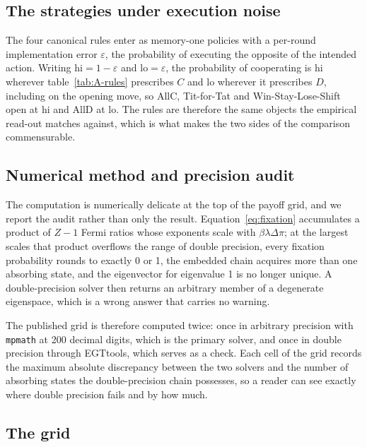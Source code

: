 \documentclass[openacc]{rsproca_new}
\newcommand{\lam}{\lambda}
\begin{document}
\subsection{The strategies under execution noise}\label{appendix:egt_strategies}

The four canonical rules enter as memory-one policies with a per-round
implementation error $\varepsilon$, the probability of executing the opposite
of the intended action. Writing $\mathrm{hi} = 1 - \varepsilon$ and
$\mathrm{lo} = \varepsilon$, the probability of cooperating is $\mathrm{hi}$
wherever table~\ref{tab:A-rules} prescribes $C$ and $\mathrm{lo}$ wherever it
prescribes $D$, including on the opening move, so AllC, Tit-for-Tat and
Win-Stay-Lose-Shift open at $\mathrm{hi}$ and AllD at $\mathrm{lo}$. The rules
are therefore the same objects the empirical read-out matches against, which is
what makes the two sides of the comparison commensurable.

\subsection{Numerical method and precision audit}\label{appendix:egt_numerics}

The computation is numerically delicate at the top of the payoff grid, and we
report the audit rather than only the result. Equation~\eqref{eq:fixation}
accumulates a product of $Z-1$ Fermi ratios whose exponents scale with
$\beta \lam \Delta\pi$; at the largest scales that product overflows the range
of double precision, every fixation probability rounds to exactly 0 or 1, the
embedded chain acquires more than one absorbing state, and the eigenvector for
eigenvalue 1 is no longer unique. A double-precision solver then returns an
arbitrary member of a degenerate eigenspace, which is a wrong answer that
carries no warning.

The published grid is therefore computed twice: once in arbitrary precision
with \texttt{mpmath} at 200 decimal digits, which is the primary solver, and
once in double precision through EGTtools, which serves as a check. Each cell
of the grid records the maximum absolute discrepancy between the two solvers
and the number of absorbing states the double-precision chain possesses, so a
reader can see exactly where double precision fails and by how much.

\subsection{The grid}\label{appendix:egt_grid}
\end{document}

